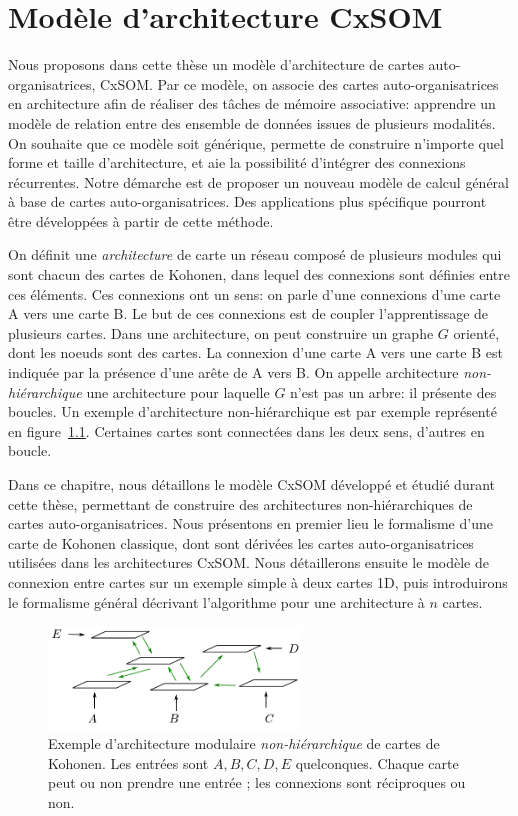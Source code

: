 \chapter{Modèle d'architecture CxSOM}
\graphicspath{{02-SOM/}}
\minitoc

Nous proposons dans cette thèse un modèle d'architecture de cartes auto-organisatrices, CxSOM. Par ce modèle, on associe des cartes auto-organisatrices en architecture afin de réaliser des tâches de mémoire associative: apprendre un modèle de relation entre des ensemble de données issues de plusieurs modalités. 
On souhaite que ce modèle soit générique, permette de construire n'importe quel forme et taille d'architecture, et aie la possibilité d'intégrer des connexions récurrentes. Notre démarche est de proposer un nouveau modèle de calcul général à base de cartes auto-organisatrices. Des applications plus spécifique pourront être développées à partir de cette méthode.


On définit une \emph{architecture} de carte un réseau composé de plusieurs modules qui sont chacun des cartes de Kohonen, dans lequel des connexions sont définies entre ces éléments. Ces connexions ont un sens: on parle d'une connexions d'une carte A vers une carte B. Le but de ces connexions est de coupler l'apprentissage de plusieurs cartes. 
Dans une architecture, on peut construire un graphe $G$ orienté, dont les noeuds sont des cartes. La connexion d'une carte A vers une carte B est indiquée par la présence d'une arête de A vers B. On appelle architecture \emph{non-hiérarchique} une architecture pour laquelle $G$ n'est pas un arbre: il présente des boucles. Un exemple d'architecture non-hiérarchique est par exemple représenté en figure~\ref{fig:archi_non_hierarchique}. Certaines cartes sont connectées dans les deux sens, d'autres en boucle.

Dans ce chapitre, nous détaillons le modèle CxSOM développé et étudié durant cette thèse, permettant de construire des architectures non-hiérarchiques de cartes auto-organisatrices. Nous présentons en premier lieu le formalisme d'une carte de Kohonen classique, dont sont dérivées les cartes auto-organisatrices utilisées dans les architectures CxSOM. Nous détaillerons ensuite le modèle de connexion entre cartes sur un exemple simple à deux cartes 1D, puis introduirons le formalisme général décrivant l'algorithme pour une architecture à $n$ cartes.


\begin{figure}
\centering
\includegraphics[width=0.6\textwidth]{architecture.pdf}
\caption{Exemple d'architecture modulaire \emph{non-hiérarchique} de cartes de Kohonen. Les entrées sont $A,B,C,D,E$ quelconques. Chaque carte peut ou non prendre une entrée ; les connexions sont réciproques ou non.}
\label{fig:archi_non_hierarchique}
\end{figure}


